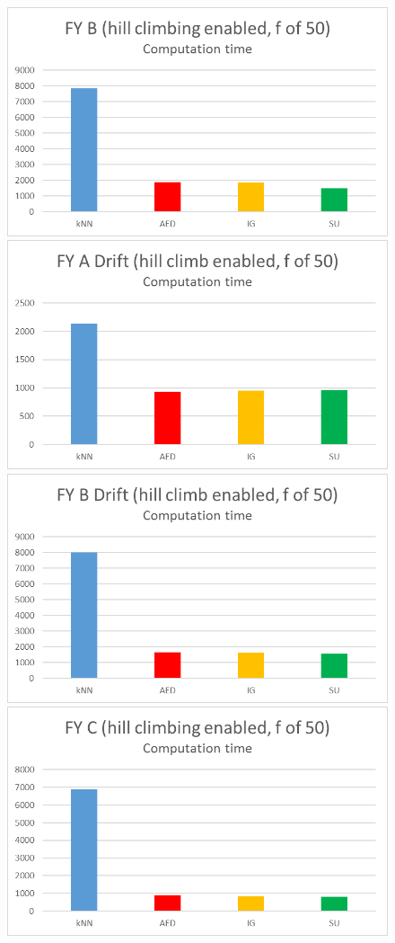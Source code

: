 \begin{figure}[h]
\includegraphics[scale=0.17]{Graphs/FY_B/H_time}
\includegraphics[scale=0.17]{Graphs/FY_A_Drift/H_time}
\includegraphics[scale=0.17]{Graphs/FY_B_Drift/H_time}
\includegraphics[scale=0.17]{Graphs/FY_C/H_time}

\end{figure}
